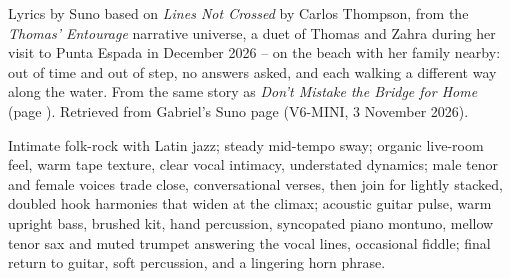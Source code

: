 
\label{sec:where-the-water-meets-me}
\begin{notes}
Lyrics by Suno based on \emph{Lines Not Crossed} by Carlos Thompson, from the \emph{Thomas' Entourage} narrative universe, a duet of Thomas and Zahra during her visit to Punta Espada in December 2026 -- on the beach with her family nearby: out of time and out of step, no answers asked, and each walking a different way along the water. From the same story as \emph{Don't Mistake the Bridge for Home} (page \pageref{sec:dont-mistake-the-bridge-for-home}). Retrieved from Gabriel's Suno page (V6-MINI, 3 November 2026).
\end{notes}
\begin{style}
Intimate folk-rock with Latin jazz; steady mid-tempo sway; organic live-room feel, warm tape texture, clear vocal intimacy, understated dynamics; male tenor and female voices trade close, conversational verses, then join for lightly stacked, doubled hook harmonies that widen at the climax; acoustic guitar pulse, warm upright bass, brushed kit, hand percussion, syncopated piano montuno, mellow tenor sax and muted trumpet answering the vocal lines, occasional fiddle; final return to guitar, soft percussion, and a lingering horn phrase.
\end{style}
